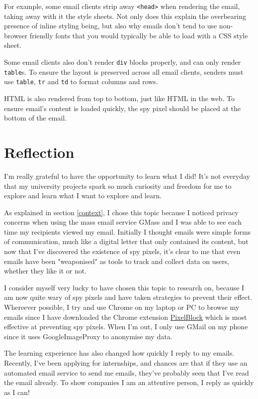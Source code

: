 \documentclass{article}
\begin{document}
For example, some email clients strip away \texttt{<head>} when rendering the email, taking away with it the style sheets. Not only does this explain the overbearing presence of inline styling being, but also why emails don't tend to use non-browser friendly fonts that you would typically be able to load with a CSS style sheet.

Some email clients also don't render \texttt{div} blocks properly, and can only render \texttt{table}s. To ensure the layout is preserved across all email clients, senders must use \texttt{table}, \texttt{tr} and \texttt{td} to format columns and rows.

HTML is also rendered from top to bottom, just like HTML in the web. To ensure email's content is loaded quickly, the spy pixel should be placed at the bottom of the email.

\section{Reflection}

I'm really grateful to have the opportunity to learn what I did! It's not everyday that my university projects spark so much curiosity and freedom for me to explore and learn what I want to explore and learn.

As explained in section \ref{context}, I chose this topic because I noticed privacy concerns when using the mass email service GMass and I was able to see each time my recipients viewed my email. Initially I thought emails were simple forms of communication, much like a digital letter that only contained its content, but now that I've discovered the existence of spy pixels, it's clear to me that even emails have been "weaponised" as tools to track and collect data on users, whether they like it or not.

I consider myself very lucky to have chosen this topic to research on, because I am now quite wary of spy pixels and have taken strategies to prevent their effect. Whereever possible, I try and use Chrome on my laptop or PC to browse my emails since I have downloaded the Chrome extension \href{https://chrome.google.com/webstore/detail/pixelblock/jmpmfcjnflbcoidlgapblgpgbilinlem?hl=en}{PixelBlock} which is most effective at preventing spy pixels. When I'm out, I only use GMail on my phone since it uses GoogleImageProxy to anonymise my data.

The learning experience has also changed how quickly I reply to my emails. Recently, I've been applying for internships, and chances are that if they use an automated email service to send me emails, they've probably seen that I've read the email already. To show companies I am an attentive person, I reply as quickly as I can!
\end{document}
